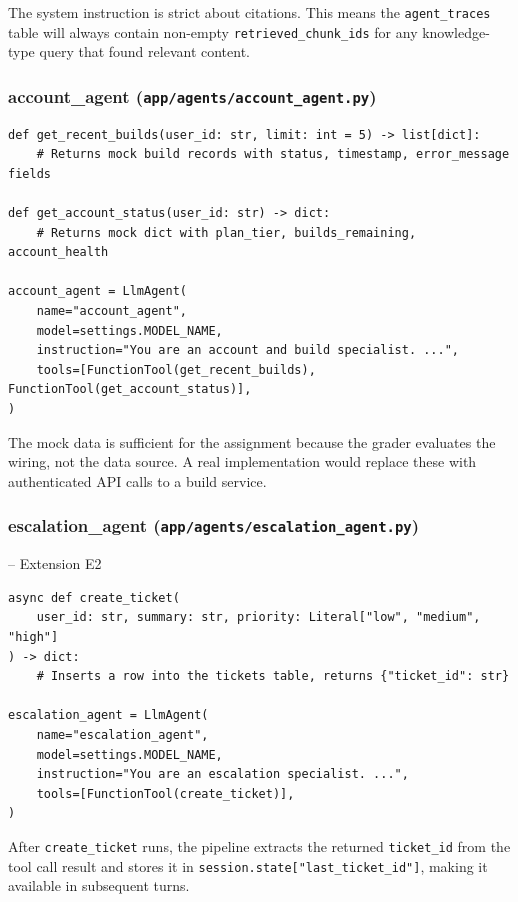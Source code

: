 \documentclass[12pt,a4paper]{article}
\begin{document}
The system instruction is strict about citations. This means the \texttt{agent\_traces} table will always contain non-empty \texttt{retrieved\_chunk\_ids} for any knowledge-type query that found relevant content.

\subsubsection{account\_agent (\texttt{app/agents/account\_agent.py})}

\begin{lstlisting}[style=python]
def get_recent_builds(user_id: str, limit: int = 5) -> list[dict]:
    # Returns mock build records with status, timestamp, error_message fields

def get_account_status(user_id: str) -> dict:
    # Returns mock dict with plan_tier, builds_remaining, account_health

account_agent = LlmAgent(
    name="account_agent",
    model=settings.MODEL_NAME,
    instruction="You are an account and build specialist. ...",
    tools=[FunctionTool(get_recent_builds), FunctionTool(get_account_status)],
)
\end{lstlisting}

The mock data is sufficient for the assignment because the grader evaluates the wiring, not the data source. A real implementation would replace these with authenticated API calls to a build service.

\subsubsection{escalation\_agent (\texttt{app/agents/escalation\_agent.py})} -- Extension E2

\begin{lstlisting}[style=python]
async def create_ticket(
    user_id: str, summary: str, priority: Literal["low", "medium", "high"]
) -> dict:
    # Inserts a row into the tickets table, returns {"ticket_id": str}

escalation_agent = LlmAgent(
    name="escalation_agent",
    model=settings.MODEL_NAME,
    instruction="You are an escalation specialist. ...",
    tools=[FunctionTool(create_ticket)],
)
\end{lstlisting}

After \texttt{create\_ticket} runs, the pipeline extracts the returned \texttt{ticket\_id} from the tool call result and stores it in \texttt{session.state["last\_ticket\_id"]}, making it available in subsequent turns.
\end{document}
